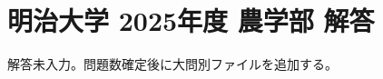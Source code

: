 \documentclass[../../uem_mat_mei_a.tex]{subfiles}
\begin{document}
    \section{明治大学 2025年度 農学部 解答}

    解答未入力。問題数確定後に大問別ファイルを追加する。
\end{document}
